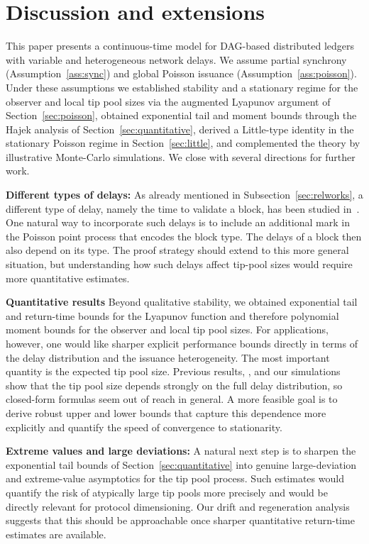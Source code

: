 \documentclass[a4paper,12pt,oneside,reqno]{amsart}
\newcommand{\1}{{\mathbf 1}}
\begin{document}
\section{Discussion and extensions}\label{sec:discussion}
This paper presents a continuous-time model for DAG-based distributed ledgers with variable and heterogeneous network delays. We assume partial synchrony (Assumption~\ref{ass:sync}) and global Poisson issuance (Assumption~\ref{ass:poisson}). Under these assumptions we established stability and a stationary regime for the observer and local tip pool sizes via the augmented Lyapunov argument of Section~\ref{sec:poisson}, obtained exponential tail and moment bounds through the Hajek analysis of Section~\ref{sec:quantitative}, derived a Little-type identity in the stationary Poisson regime in Section~\ref{sec:little}, and complemented the theory by illustrative Monte-Carlo simulations. We close with several directions for further work.

\textbf{Different types of delays:}
As already mentioned in Subsection~\ref{sec:relworks}, a different type of delay, namely the time to validate a block, has been studied in~\cite{penzkofer2021impact}.  One natural way to incorporate such delays is to include an additional mark in the Poisson point process that encodes the block type. The delays of a block then also depend on its type. 
The proof strategy should extend to this more general situation, but understanding how such delays affect tip-pool sizes would require more quantitative estimates.

\textbf{Quantitative results} 
Beyond qualitative stability, we obtained exponential tail and return-time bounds for the Lyapunov function and therefore polynomial moment bounds for the observer and local tip pool sizes. For applications, however, one would like sharper explicit performance bounds directly in terms of the delay distribution and the issuance heterogeneity. The most important quantity is the expected tip pool size. Previous results, \cite{kumar2022effect,penzkofer2021impact, cullen2019-variable-delay-9142287}, and our simulations show that the tip pool size depends strongly on the full delay distribution, so closed-form formulas seem out of reach in general. A more feasible goal is to derive robust upper and lower bounds that capture this dependence more explicitly and quantify the speed of convergence to stationarity.

\textbf{Extreme values and large deviations: } A natural next step is to sharpen the exponential tail bounds of Section~\ref{sec:quantitative} into genuine large-deviation and extreme-value asymptotics for the tip pool process. Such estimates would quantify the risk of atypically large tip pools more precisely and would be directly relevant for protocol dimensioning. Our drift and regeneration analysis suggests that this should be approachable once sharper quantitative return-time estimates are available.
\end{document}
